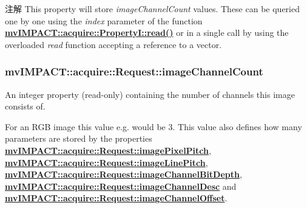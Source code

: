 \begin{DoxyNote}{注解}
This property will store {\itshape image\+Channel\+Count} values. These can be queried one by one using the {\itshape index} parameter of the function {\bfseries \hyperlink{classmv_i_m_p_a_c_t_1_1acquire_1_1_enum_property_i_a6f88e97f646978391226aaf82cd5955d}{mv\+I\+M\+P\+A\+C\+T\+::acquire\+::\+Property\+I\+::read()}} or in a single call by using the overloaded {\itshape read} function accepting a reference to a vector. 
\end{DoxyNote}
\hypertarget{classmv_i_m_p_a_c_t_1_1acquire_1_1_request_abdd5f9eac58473f54725987c7fd1d9a7}{
\subsubsection[{image\+Channel\+Count}]{ mv\+I\+M\+P\+A\+C\+T\+::acquire\+::\+Request\+::image\+Channel\+Count}}\label{classmv_i_m_p_a_c_t_1_1acquire_1_1_request_abdd5f9eac58473f54725987c7fd1d9a7}


An integer property {\bfseries }(read-\/only) containing the number of channels this image consists of. 

For an R\+G\+B image this value e.\+g. would be 3. This value also defines how many parameters are stored by the properties {\bfseries \hyperlink{classmv_i_m_p_a_c_t_1_1acquire_1_1_request_a00bdcb0cbf23ca71092474d93a80fb0c}{mv\+I\+M\+P\+A\+C\+T\+::acquire\+::\+Request\+::image\+Pixel\+Pitch}}, ~\newline
{\bfseries \hyperlink{classmv_i_m_p_a_c_t_1_1acquire_1_1_request_ac94ef78b0834deb1f291dacc97c600bc}{mv\+I\+M\+P\+A\+C\+T\+::acquire\+::\+Request\+::image\+Line\+Pitch}}, ~\newline
{\bfseries \hyperlink{classmv_i_m_p_a_c_t_1_1acquire_1_1_request_aee32f6b6dabfd192119afa932045ecbe}{mv\+I\+M\+P\+A\+C\+T\+::acquire\+::\+Request\+::image\+Channel\+Bit\+Depth}}, ~\newline
{\bfseries \hyperlink{classmv_i_m_p_a_c_t_1_1acquire_1_1_request_ac0e635d0a9be516925d40c5d1b77b1da}{mv\+I\+M\+P\+A\+C\+T\+::acquire\+::\+Request\+::image\+Channel\+Desc}} and ~\newline
{\bfseries \hyperlink{classmv_i_m_p_a_c_t_1_1acquire_1_1_request_a06a1b6f82fadab310b409434af963b36}{mv\+I\+M\+P\+A\+C\+T\+::acquire\+::\+Request\+::image\+Channel\+Offset}}.

